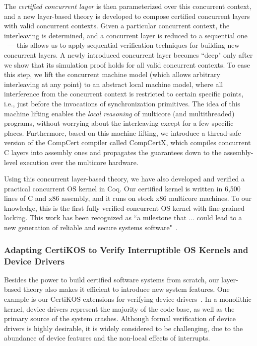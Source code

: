 \documentclass[a4paper, 10pt]{article}
\begin{document}
\begin{small}
The \emph{certified concurrent layer}  is then parameterized over this concurrent context,
and a new layer-based theory is developed to 
compose certified concurrent layers with valid concurrent contexts.
Given a particular concurrent context,
the interleaving is determined,
and a concurrent layer is reduced to a sequential one ~--- this allows us to apply sequential verification techniques for
building new concurrent layers.
A newly introduced concurrent layer becomes ``deep" only after we show that its simulation proof holds for all valid concurrent contexts.
To ease this step, we lift the concurrent machine model (which allows arbitrary interleaving at any point) to an abstract local machine model,
where all interference from the concurrent context is restricted to
 certain specific points, i.e.,
just before the invocations of synchronization primitives. The idea of this machine lifting
enables the \emph{local reasoning} of multicore (and multithreaded) programs,
without worrying about the  interleaving except for a few specific places. 
Furthermore, based on this machine lifting,
we introduce a thread-safe version of
the CompCert compiler called CompCertX, which compiles concurrent C layers
into assembly ones and 
propagates the guarantees down to the assembly-level execution over the multicore hardware.
 
Using this concurrent layer-based theory,
we have also developed and verified a practical concurrent OS
kernel in Coq. Our certified kernel is written in 6,500 lines of
C and x86 assembly, and it runs on stock x86 multicore
machines. To our knowledge, this is the first fully verified concurrent
OS kernel  with fine-grained locking.
This work has been recognized as ``a milestone that ... could lead to a new generation of reliable and secure systems software"~\cite{news}.

\subsubsection*{\small Adapting CertiKOS to Verify Interruptible OS Kernels and Device Drivers}
Besides the power to build certified software systems from  scratch, our layer-based theory also makes it efficient to introduce new system features.  
One example is our CertiKOS extensions for verifying device drivers~\cite{pldi16-device, jar-device}.
In a monolithic kernel,
device drivers represent the majority of the code base, as well as the primary source of the system crashes.
Although formal verification of device drivers is highly desirable, it is widely considered to be challenging, due to the abundance of device features
and the non-local effects of interrupts.


\end{small}
\end{document}
